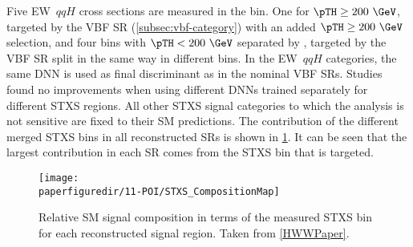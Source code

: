 Five EW~$qqH$ cross sections are measured in the \TwoJet bin. One for $\pTH \ge200~\GeV$, targeted by the VBF \TwoJet SR (\cref{subsec:vbf-category}) with an added $\pTH \geq 200~\GeV$ selection, and four bins with $\pTH < 200~\GeV$ separated by \mjj, targeted by the VBF \TwoJet SR split in the same way in different \mjj bins. 
In the EW~$qqH$ categories, the same DNN is used as final discriminant as in the nominal VBF SRs. Studies found no improvements when using different DNNs trained separately for different STXS regions.
All other STXS signal categories to which the analysis is not sensitive are fixed to their SM predictions. 
The contribution of the different merged STXS bins in all reconstructed SRs is shown in \cref{fig:STXS_Composition}. 
It can be seen that the largest contribution in each SR comes from the STXS bin that is targeted. 
\begin{figure}[!h]
  \centering
    \texttt{[image: \\paperfiguredir/11-POI/STXS\_CompositionMap]}
  \caption{
    Relative SM signal composition in terms of the measured STXS bin for each reconstructed signal region. Taken from \cref{HWWPaper}. 
    \label{fig:STXS_Composition}
  }
\end{figure}
